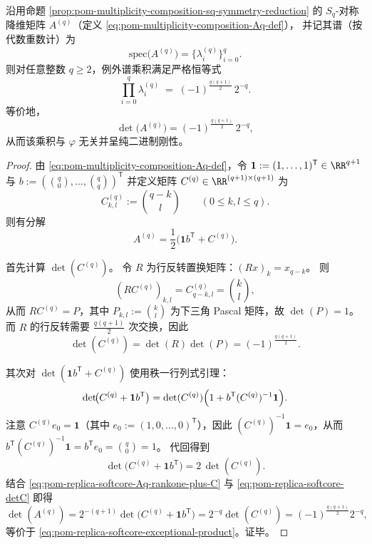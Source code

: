 \begin{theorem}[例外谱乘积的完全闭式与三角数符号律]\label{thm:pom-replica-softcore-exceptional-spectrum-product}
沿用命题 \ref{prop:pom-multiplicity-composition-sq-symmetry-reduction} 的
\(S_q\)-对称降维矩阵 \(A^{(q)}\)（定义 \eqref{eq:pom-multiplicity-composition-Aq-def}），
并记其谱（按代数重数计）为
\[
\mathrm{spec}\!\bigl(A^{(q)}\bigr)=\{\lambda_i^{(q)}\}_{i=0}^{q}.
\]
则对任意整数 \(q\ge 2\)，例外谱乘积满足严格恒等式
\begin{equation}\label{eq:pom-replica-softcore-exceptional-product}
\boxed{\;
\prod_{i=0}^{q}\lambda_i^{(q)}
\;=\;
(-1)^{\frac{q(q+1)}{2}}\,2^{-q}. \;}
\end{equation}
等价地，
\[
\det\!\bigl(A^{(q)}\bigr)=(-1)^{\frac{q(q+1)}{2}}\,2^{-q},
\]
从而该乘积与 \(\varphi\) 无关并呈纯二进制刚性。
\end{theorem}
\begin{proof}
由 \eqref{eq:pom-multiplicity-composition-Aq-def}，令
\(
\mathbf{1}:=(1,\dots,1)^{\mathsf T}\in\RR^{q+1}
\)
与
\(
b:=(\binom{q}{0},\dots,\binom{q}{q})^{\mathsf T}
\)
并定义矩阵 \(C^{(q)}\in\RR^{(q+1)\times(q+1)}\) 为
\[
C^{(q)}_{k,l}:=\binom{q-k}{l}\qquad(0\le k,l\le q).
\]
则有分解
\begin{equation}\label{eq:pom-replica-softcore-Aq-rankone-plus-C}
A^{(q)}=\frac12\bigl(\mathbf{1}b^{\mathsf T}+C^{(q)}\bigr).
\end{equation}
\par
首先计算 \(\det(C^{(q)})\)。
令 \(R\) 为行反转置换矩阵：\((Rx)_k=x_{q-k}\)。
则
\[
(RC^{(q)})_{k,l}=C^{(q)}_{q-k,l}=\binom{k}{l},
\]
从而 \(RC^{(q)}=P\)，其中 \(P_{k,l}:=\binom{k}{l}\) 为下三角 Pascal 矩阵，故 \(\det(P)=1\)。
而 \(R\) 的行反转需要 \(\frac{q(q+1)}{2}\) 次交换，因此
\begin{equation}\label{eq:pom-replica-softcore-detC}
\det(C^{(q)})=\det(R)\det(P)=(-1)^{\frac{q(q+1)}{2}}.
\end{equation}
\par
其次对 \(\det(\mathbf{1}b^{\mathsf T}+C^{(q)})\) 使用秩一行列式引理：
\[
\det\!\bigl(C^{(q)}+\mathbf{1}b^{\mathsf T}\bigr)=\det(C^{(q)})\Bigl(1+b^{\mathsf T}(C^{(q)})^{-1}\mathbf{1}\Bigr).
\]
注意 \(C^{(q)}e_0=\mathbf{1}\)（其中 \(e_0:=(1,0,\dots,0)^{\mathsf T}\)），因此 \((C^{(q)})^{-1}\mathbf{1}=e_0\)，从而
\(
b^{\mathsf T}(C^{(q)})^{-1}\mathbf{1}=b^{\mathsf T}e_0=\binom{q}{0}=1
\)。
代回得到
\[
\det\!\bigl(C^{(q)}+\mathbf{1}b^{\mathsf T}\bigr)=2\,\det(C^{(q)}).
\]
结合 \eqref{eq:pom-replica-softcore-Aq-rankone-plus-C} 与 \eqref{eq:pom-replica-softcore-detC} 即得
\[
\det(A^{(q)})
=2^{-(q+1)}\det\!\bigl(C^{(q)}+\mathbf{1}b^{\mathsf T}\bigr)
=2^{-q}\det(C^{(q)})
=(-1)^{\frac{q(q+1)}{2}}2^{-q},
\]
等价于 \eqref{eq:pom-replica-softcore-exceptional-product}。证毕。
\end{proof}

